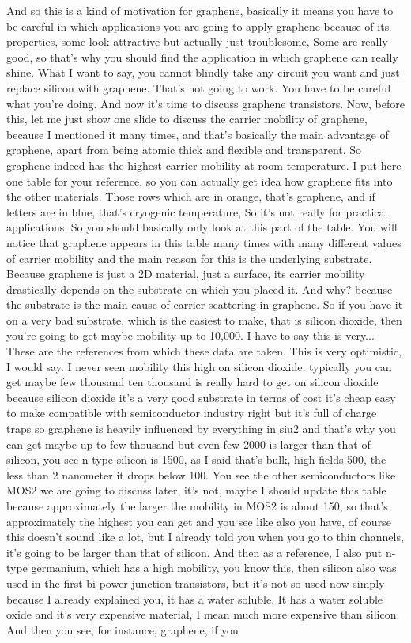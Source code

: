 And so this is a kind of motivation for graphene, basically it means you have to be careful in which applications you are going to apply graphene because of its properties, some look attractive but actually just troublesome, Some are really good, so that's why you should find the application in which graphene can really shine. What I want to say, you cannot blindly take any circuit you want and just replace silicon with graphene. That's not going to work. You have to be careful what you're doing. And now it's time to discuss graphene transistors. Now, before this, let me just show one slide to discuss the carrier mobility of graphene, because I mentioned it many times, and that's basically the main advantage of graphene, apart from being atomic thick and flexible and transparent. So graphene indeed has the highest carrier mobility at room temperature. I put here one table for your reference, so you can actually get idea how graphene fits into the other materials. Those rows which are in orange, that's graphene, and if letters are in blue, that's cryogenic temperature, So it's not really for practical applications. So you should basically only look at this part of the table. You will notice that graphene appears in this table many times with many different values of carrier mobility and the main reason for this is the underlying substrate. Because graphene is just a 2D material, just a surface, its carrier mobility drastically depends on the substrate on which you placed it. And why? because the substrate is the main cause of carrier scattering in graphene. So if you have it on a very bad substrate, which is the easiest to make, that is silicon dioxide, then you're going to get maybe mobility up to 10,000. I have to say this is very... These are the references from which these data are taken. This is very optimistic, I would say. I never seen mobility this high on silicon dioxide. typically you can get maybe few thousand ten thousand is really hard to get on silicon dioxide because silicon dioxide it's a very good substrate in terms of cost it's cheap easy to make compatible with semiconductor industry right but it's full of charge traps so graphene is heavily influenced by everything in siu2 and that's why you can get maybe up to few thousand but even few 2000 is larger than that of silicon, you see n-type silicon is 1500, as I said that's bulk, high fields 500, the less than 2 nanometer it drops below 100. You see the other semiconductors like MOS2 we are going to discuss later, it's not, maybe I should update this table because approximately the larger the mobility in MOS2 is about 150, so that's approximately the highest you can get and you see like also you have, of course this doesn't sound like a lot, but I already told you when you go to thin channels, it's going to be larger than that of silicon. And then as a reference, I also put n-type germanium, which has a high mobility, you know this, then silicon also was used in the first bi-power junction transistors, but it's not so used now simply because I already explained you, it has a water soluble, It has a water soluble oxide and it's very expensive material, I mean much more expensive than silicon. And then you see, for instance, graphene, if you 